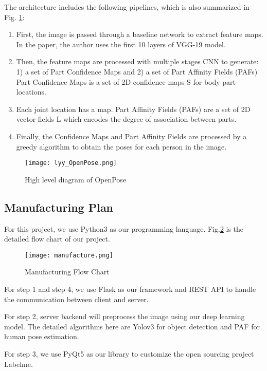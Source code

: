 The architecture includes the following pipelines, which is also summarized in
Fig. \ref{fig:openpose_arch}:

\begin{enumerate}
    \item First, the image is passed through a baseline network to extract
feature maps. In the paper, the author uses the first 10 layers of VGG-19 model.
    \item Then, the feature maps are processed with multiple stages CNN to
generate: 1) a set of Part Confidence Maps and 2) a set of Part Affinity Fields
(PAFs) Part Confidence Maps is a set of 2D confidence maps S for body part
locations.
    \item Each joint location has a map. Part Affinity Fields (PAFs) are a set
of 2D vector fields L which encodes the degree of association between parts.
    \item Finally, the Confidence Maps and Part Affinity Fields are processed
by a greedy algorithm to obtain the poses for each person in the image.

\end{enumerate}

    \begin{figure}[h!]
        \centering \texttt{[image: lyy\_OpenPose.png]}
        \caption{High level diagram of OpenPose}
        \label{fig:openpose_arch}
    \end{figure}


\subsection{Manufacturing Plan}
For this project, we use Python3 as our programming language.
Fig.\ref{fig:Manu_FlowChart} is the detailed flow chart of our project.
\begin{figure}[h!]
  \centering \texttt{[image: manufacture.png]}
  \caption{Manufacturing Flow Chart}
  \label{fig:Manu_FlowChart}
\end{figure}

For step 1 and step 4, we use Flask as our framework and REST API to handle the
communication between client and server.

For step 2, server backend will preprocess the image using our deep learning
model. The detailed algorithms here are Yolov3 for object detection and PAF for
human pose estimation.


For step 3, we use PyQt5 as our library to customize the open sourcing project
Labelme.

